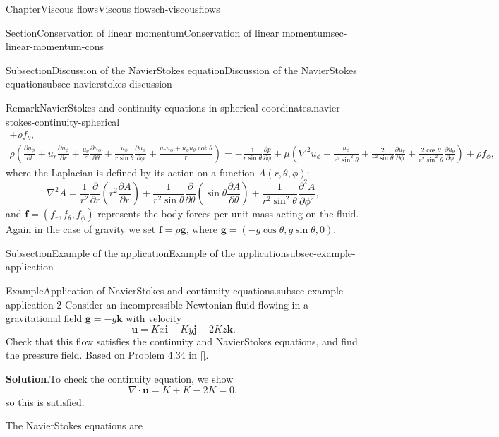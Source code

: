 \documentclass[oneside,10pt,]{book}
\newcommand{\blocktitlefont}{\relax}
\newcommand{\xreffont}{\relax}
\numberwithin{equation}{section}
\newcommand{\pd}[2]{\frac{\partial#1}{\partial#2}}
\newcommand{\bu}{\boldsymbol{u}}
\renewcommand{\bf}{\boldsymbol{f}}
\newcommand{\bg}{\boldsymbol{g}}
\newcommand{\bi}{\boldsymbol{i}}
\newcommand{\bj}{\boldsymbol{j}}
\newcommand{\bk}{\boldsymbol{k}}
\begin{document}
\begin{chapterptx}{Chapter}{Viscous flows}{}{Viscous flows}{}{}{ch-viscousflows}
\begin{sectionptx}{Section}{Conservation of linear momentum}{}{Conservation of linear momentum}{}{}{sec-linear-momentum-cons}
\begin{subsectionptx}{Subsection}{Discussion of the Navier\textendash{}Stokes equation}{}{Discussion of the Navier\textendash{}Stokes equation}{}{}{subsec-navierstokes-discussion}
\begin{remark}{Remark}{Navier\textendash{}Stokes and continuity equations in spherical coordinates.}{navier-stokes-continuity-spherical}
\begin{gather*}
+\rho f_\theta,\\
\rho\left(\pd{u_{\phi}}{t}+u_r\pd{u_{\phi}}{r}+\frac{u_{\theta}}{r}\pd{u_{\phi}}{\theta}+\frac{u_{\phi}}{r\sin\theta}\pd{u_{\phi}}{\phi}+\frac{u_ru_{\phi}+u_{\phi}u_{\theta}\cot\theta}{r}\right)
=-\frac1{r\sin\theta}\pd{p}{\phi}
+\mu\left(\nabla^2u_\phi-\frac{u_\phi}{r^2\sin^2\theta}+\frac{2}{r^2\sin\theta}\pd{u_r}{\phi}+\frac{2\cos\theta}{r^2\sin^2\theta}\pd{u_\theta}{\phi}\right)
+\rho f_\phi,
\end{gather*}
where the Laplacian is defined by its action on a function \(A(r,\theta,\phi)\):%
\begin{equation*}
\nabla^2A=\frac1{r^2}\pd{}{r}\left(r^2\pd{A}{r}\right)+\frac1{r^2\sin\theta}\pd{}{\theta}\left(\sin\theta\pd{A}{\theta}\right)+\frac1{r^2\sin^2\theta}\pd{^2A}{\phi^2},
\end{equation*}
and \(\bf=(f_r,f_\theta,f_\phi)\) represents the body forces per unit mass acting on the fluid. Again in the case of gravity we set \(\bf=\rho{\bg}\), where \(\bg=(-g\cos\theta,g\sin\theta,0)\).%
\end{remark}
\end{subsectionptx}
%
%
\typeout{************************************************}
\typeout{************************************************}
%
\begin{subsectionptx}{Subsection}{Example of the application}{}{Example of the application}{}{}{subsec-example-application}
\begin{example}{Example}{Application of Navier\textendash{}Stokes and continuity equations.}{subsec-example-application-2}%
Consider an incompressible Newtonian fluid flowing in a gravitational field \(\bg=-g\bk\) with velocity%
\begin{equation*}
\bu=Kx\bi+Ky\bj-2Kz\bk.
\end{equation*}
Check that this flow satisfies the continuity and Navier\textendash{}Stokes equations, and find the pressure field. Based on Problem 4.34 in \hyperlink{ref-white-5}{[{\xreffont 9}]}.%
\par\smallskip%
\noindent\textbf{\blocktitlefont Solution}.\hypertarget{subsec-example-application-2-3}{}\quad{}To check the continuity equation, we show%
\begin{equation*}
\nabla\cdot\bu=K+K-2K=0,
\end{equation*}
so this is satisfied.%
\par
The Navier\textendash{}Stokes equations are%
\begin{equation*}

\end{equation*}
\end{example}
\end{subsectionptx}
\end{sectionptx}
\end{chapterptx}
\end{document}
